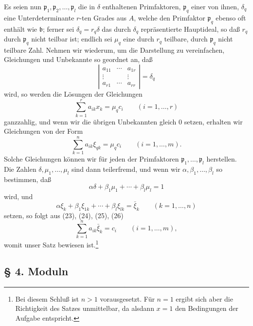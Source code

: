 \documentclass[11pt,a4paper]{article}
\begin{document}
Es seien nun \(\mathfrak p_1,\mathfrak p_2,\ldots,\mathfrak p_l\) die in \(\delta\) enthaltenen Primfaktoren, \(\mathfrak p_q\) einer von ihnen, \(\delta_q\) eine Unterdeterminante \(r\)-ten Grades aus \(A\), welche den Primfaktor \(\mathfrak p_q\) ebenso oft enthält wie \(\mathfrak b\); ferner sei \(\delta_q=r_q\delta\) das durch \(\delta_q\) repräsentierte Hauptideal, so daß \(r_q\) durch \(\mathfrak p_q\) nicht teilbar ist; endlich sei \(\mu_q\) eine durch \(r_q\) teilbare, durch \(\mathfrak p_q\) nicht teilbare Zahl. Nehmen wir wiederum, um die Darstellung zu vereinfachen, Gleichungen und Unbekannte so geordnet an, daß
\[
 \left|\begin{array}{ccc}
 a_{11}&\cdots&a_{1r}\\
 \vdots&&\vdots\\
 a_{r1}&\cdots&a_{rr}
 \end{array}\right|=\delta_q
\]
wird, so werden die Lösungen der Gleichungen
\[
 \sum_{k=1}^{r}a_{ik}x_k=\mu_q c_i\qquad(i=1,\ldots,r)
\]
ganzzahlig, und wenn wir die übrigen Unbekannten gleich \(0\) setzen, erhalten wir Gleichungen von der Form
\[
 \sum_{k=1}^{n}a_{ik}\xi_{qk}=\mu_q c_i\qquad(i=1,\ldots,m). \tag{24}
\]
Solche Gleichungen können wir für jeden der Primfaktoren \(\mathfrak p_1,\ldots,\mathfrak p_l\) herstellen. Die Zahlen \(\delta,\mu_1,\ldots,\mu_l\) sind dann teilerfremd, und wenn wir \(\alpha,\beta_1,\ldots,\beta_l\) so bestimmen, daß
\[
 \alpha\delta+\beta_1\mu_1+\cdots+\beta_l\mu_l=1 \tag{25}
\]
wird, und
\[
 \alpha\xi_k+\beta_1\xi_{1k}+\cdots+\beta_l\xi_{lk}=\bar\xi_k
 \qquad(k=1,\ldots,n) \tag{26}
\]
setzen, so folgt aus (23), (24), (25), (26)
\[
 \sum_{k=1}^{n}a_{ik}\bar\xi_k=c_i\qquad(i=1,\ldots,m), \tag{27}
\]
womit unser Satz bewiesen ist.\footnote{Bei diesem Schluß ist \(n>1\) vorausgesetzt. Für \(n=1\) ergibt sich aber die Richtigkeit des Satzes unmittelbar, da alsdann \(x=1\) den Bedingungen der Aufgabe entspricht.}

\subsection*{§ 4. Moduln}
\end{document}
